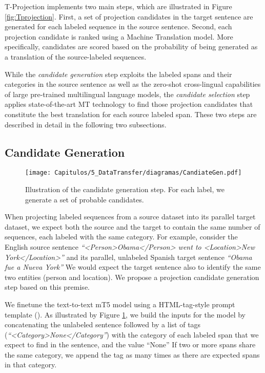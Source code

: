 T-Projection implements two main steps, which are illustrated in Figure \ref{fig:Tprojection}. First, a set of projection candidates in the target sentence are generated for each labeled sequence in the source sentence. Second, each projection candidate is ranked using a Machine Translation model. More specifically, candidates are scored based on the probability of being generated as a translation of the source-labeled sequences. 

While the \emph{candidate generation} step exploits the labeled spans and their categories in the source sentence as well as the zero-shot cross-lingual capabilities of large pre-trained multilingual language models, the \emph{candidate selection} step
applies state-of-the-art MT technology to find those 
projection candidates that constitute the best translation for each source labeled span. These two steps are described in detail in the following two subsections. 

\subsection{Candidate Generation}\label{sc5:candidate-generation}

\begin{figure}[t]
\centering
\texttt{[image: Capitulos/5\_DataTransfer/diagramas/CandiateGen.pdf]}
\caption{Illustration of the candidate generation step. For each label, we generate a set of probable candidates.}
\label{fig:CandiateGen}
\end{figure} 

When projecting labeled sequences from a source dataset into its parallel target dataset, we expect both the source and the target to contain the same number of sequences, each labeled with the same category. For example, consider the English source sentence \textit{``<Person>Obama</Person> went to <Location>New York</Location>''} and its parallel, unlabeled Spanish target sentence \textit{``Obama fue a Nueva York''} We would expect the target sentence also to identify the same two entities (person and location). We propose a projection candidate generation step based on this premise. 

We finetune the text-to-text mT5 \cite{mt5} model using a HTML-tag-style prompt template
(\cite{huang-etal-2022-multilingual-generative}). As illustrated by Figure \ref{fig:CandiateGen}, we build the inputs for the model by concatenating the unlabeled sentence followed by a list of tags (\textit{``<Category>None</Category''}) with the category of each labeled span that we expect to find in the sentence, and the value ``None'' If two or more spans share the same category, we append the tag as many times as there are expected spans in that category.

